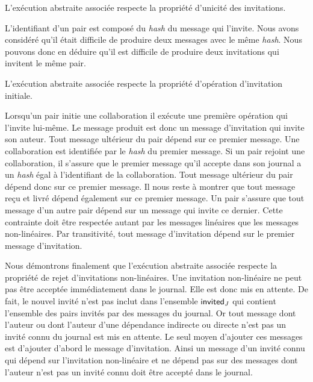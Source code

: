 L'exécution abstraite associée respecte la propriété d'unicité des invitations.

L'identifiant d'un pair est composé du \emph{hash} du message qui l'invite.
Nous avons considéré qu'il était difficile de produire deux messages avec le même \emph{hash}.
Nous pouvons donc en déduire qu'il est difficile de produire deux invitations qui invitent le même pair.

L'exécution abstraite associée respecte la propriété d'opération d'invitation initiale.

Lorsqu'un pair initie une collaboration il exécute une première opération qui l'invite lui-même.
Le message produit est donc un message d'invitation qui invite son auteur.
Tout message ultérieur du pair dépend sur ce premier message.
Une collaboration est identifiée par le \emph{hash} du premier message.
Si un pair rejoint une collaboration, il s'assure que le premier message qu'il accepte dans son journal a un \emph{hash} égal à l'identifiant de la collaboration.
Tout message ultérieur du pair dépend donc sur ce premier message.
Il nous reste à montrer que tout message reçu et livré dépend également sur ce premier message.
Un pair s'assure que tout message d'un autre pair dépend sur un message qui invite ce dernier.
Cette contrainte doit être respectée autant par les messages linéaires que les messages non-linéaires.
Par transitivité, tout message d'invitation dépend sur le premier message d'invitation.

Nous démontrons finalement que l'exécution abstraite associée respecte la propriété de rejet d'invitations non-linéaires.
Une invitation non-linéaire ne peut pas être acceptée immédiatement dans le journal.
Elle est donc mis en attente.
De fait, le nouvel invité n'est pas inclut dans l'ensemble $\operatorname{\mathsf{invited}}_J$ qui contient l'ensemble des pairs invités par des messages du journal.
Or tout message dont l'auteur ou dont l'auteur d'une dépendance indirecte ou directe n'est pas un invité connu du journal est mis en attente.
Le seul moyen d'ajouter ces messages est d'ajouter d'abord le message d'invitation.
Ainsi un message d'un invité connu qui dépend sur l'invitation non-linéaire et ne dépend pas sur des messages dont l'auteur n'est pas un invité connu doit être accepté dans le journal.


